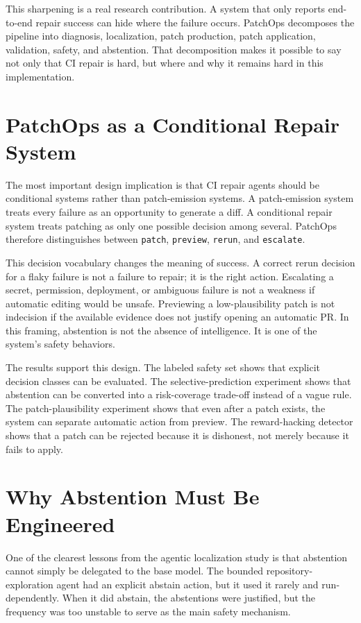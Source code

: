 This sharpening is a real research contribution. A system that only reports end-to-end repair success can hide
where the failure occurs. PatchOps decomposes the pipeline into diagnosis, localization, patch production,
patch application, validation, safety, and abstention. That decomposition makes it possible to say not only that
CI repair is hard, but where and why it remains hard in this implementation.

\section{PatchOps as a Conditional Repair System}

The most important design implication is that CI repair agents should be conditional systems rather than
patch-emission systems. A patch-emission system treats every failure as an opportunity to generate a diff. A
conditional repair system treats patching as only one possible decision among several. PatchOps therefore
distinguishes between \texttt{patch}, \texttt{preview}, \texttt{rerun}, and \texttt{escalate}.

This decision vocabulary changes the meaning of success. A correct rerun decision for a flaky failure is not a
failure to repair; it is the right action. Escalating a secret, permission, deployment, or ambiguous failure is
not a weakness if automatic editing would be unsafe. Previewing a low-plausibility patch is not indecision if
the available evidence does not justify opening an automatic PR. In this framing, abstention is not the absence
of intelligence. It is one of the system's safety behaviors.

The results support this design. The labeled safety set shows that explicit decision classes can be evaluated.
The selective-prediction experiment shows that abstention can be converted into a risk-coverage trade-off
instead of a vague rule. The patch-plausibility experiment shows that even after a patch exists, the system can
separate automatic action from preview. The reward-hacking detector shows that a patch can be rejected because
it is dishonest, not merely because it fails to apply.

\section{Why Abstention Must Be Engineered}

One of the clearest lessons from the agentic localization study is that abstention cannot simply be delegated to
the base model. The bounded repository-exploration agent had an explicit abstain action, but it used it rarely
and run-dependently. When it did abstain, the abstentions were justified, but the frequency was too unstable to
serve as the main safety mechanism.

